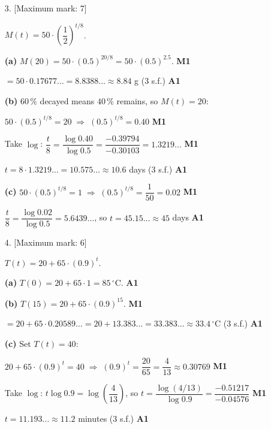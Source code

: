 \documentclass[12pt, twoside]{article}
\begin{document}
\begin{enumerate}[itemsep=0.3cm]
\textbf{(c)} $200 \cdot 3^{\,t/10} = 5000 \;\Rightarrow\; 3^{\,t/10} = 25$
\hfill \textbf{M1\;A1}

Take $\log$: \;$\dfrac{t}{10} \log 3 = \log 25$, \;so\;
$\dfrac{t}{10} = \dfrac{\log 25}{\log 3} = 2.9299\ldots$ \hfill \textbf{M1}

$t = 29.299\ldots \approx 29.3$ hours (1 d.p.) \hfill \textbf{A1}

\newpage

\item[3.] [Maximum mark: 7]

$M(t) = 50 \cdot \left(\dfrac{1}{2}\right)^{t/8}$.

\textbf{(a)} $M(20) = 50 \cdot (0.5)^{20/8} = 50 \cdot (0.5)^{2.5}$.
\hfill \textbf{M1}

$= 50 \cdot 0.17677\ldots = 8.8388\ldots \approx 8.84$ g (3 s.f.)
\hfill \textbf{A1}

\medskip

\textbf{(b)} $60\,\%$ decayed means $40\,\%$ remains, so $M(t) = 20$:

$50 \cdot (0.5)^{t/8} = 20 \;\Rightarrow\; (0.5)^{t/8} = 0.40$
\hfill \textbf{M1}

Take $\log$: \;$\dfrac{t}{8} = \dfrac{\log 0.40}{\log 0.5}
= \dfrac{-0.39794}{-0.30103} = 1.3219\ldots$ \hfill \textbf{M1}

$t = 8 \cdot 1.3219\ldots = 10.575\ldots \approx 10.6$ days (3 s.f.)
\hfill \textbf{A1}

\medskip

\textbf{(c)} $50 \cdot (0.5)^{t/8} = 1 \;\Rightarrow\; (0.5)^{t/8}
= \dfrac{1}{50} = 0.02$ \hfill \textbf{M1}

$\dfrac{t}{8} = \dfrac{\log 0.02}{\log 0.5} = 5.6439\ldots$, \;so\;
$t = 45.15\ldots \approx 45$ days \hfill \textbf{A1}

\newpage

\item[4.] [Maximum mark: 6]

$T(t) = 20 + 65 \cdot (0.9)^t$.

\textbf{(a)} $T(0) = 20 + 65 \cdot 1 = 85\,^{\circ}\text{C}$.
\hfill \textbf{A1}

\medskip

\textbf{(b)} $T(15) = 20 + 65 \cdot (0.9)^{15}$. \hfill \textbf{M1}

$= 20 + 65 \cdot 0.20589\ldots = 20 + 13.383\ldots
= 33.383\ldots \approx 33.4\,^{\circ}\text{C}$ (3 s.f.) \hfill \textbf{A1}

\medskip

\textbf{(c)} Set $T(t) = 40$:

$20 + 65 \cdot (0.9)^t = 40 \;\Rightarrow\; (0.9)^t
= \dfrac{20}{65} = \dfrac{4}{13} \approx 0.30769$ \hfill \textbf{M1}

Take $\log$: \;$t \log 0.9 = \log\!\left(\dfrac{4}{13}\right)$, \;so\;
$t = \dfrac{\log(4/13)}{\log 0.9} = \dfrac{-0.51217}{-0.04576}$
\hfill \textbf{M1}

$t = 11.193\ldots \approx 11.2$ minutes (3 s.f.) \hfill \textbf{A1}

\end{enumerate}
\end{document}
